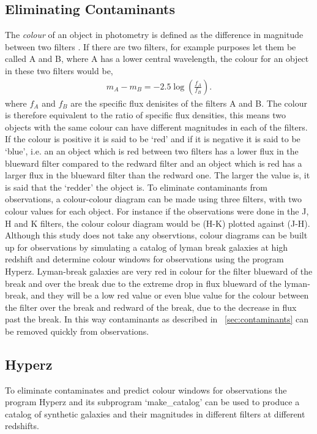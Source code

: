     \subsection{Eliminating Contaminants} %
    \label{sub:Eliminating_Contanimants}
		 The \emph{colour} of an object in photometry is defined as the difference in magnitude between two filters \cite[21]{Romanishin}.  If there are two filters, for example purposes let them be called A and B, where A has a lower central wavelength, the colour for an object in these two filters would be,
		\begin{align}
			m_A-m_B=-2.5\log\left(\frac{f_A}{f_B}\right).
		\end{align}
		 where $f_A$ and $f_B$ are the specific flux denisites of the filters A and B\cite[19]{Romanishin}. The colour is therefore equivalent to the ratio of specific flux densities, this means two objects with the same colour can have different magnitudes in each of the filters. If the colour is positive it is said to be `red' and if it is negative it is said to be `blue', i.e. an an object which is red between two filters has a lower flux in the blueward filter compared to the redward filter and an object which is red has a larger flux in the blueward filter than the redward one.  The larger the value is, it is said that the `redder' the object is. To eliminate contaminants from observations, a colour-colour diagram can be made using three filters, with two colour values for each object. For instance if the observations were done in the J, H and K filters, the colour colour diagram would be (H-K) plotted against (J-H). Although this study does not take any observtions, colour diagrams can be built up for observations by simulating a catalog of lyman break galaxies at high redshift and determine colour windows for observations using the program Hyperz. Lyman-break galaxies are very red in colour for the filter blueward of the break and over the break due to the extreme drop in flux blueward of the lyman-break, and they will be a low red value or even blue value for the colour between the filter over the break and redward of the break, due to the decrease in flux past the break. In this way contaminants as described in ~\ref{sec:contaminants} can be removed quickly from observations.


	\subsection{Hyperz} %
	\label{sub:Hyperz}
		To eliminate contaminates and predict colour windows for observations the program Hyperz and its subprogram `make\_catalog' can be used to produce a catalog of synthetic galaxies and their magnitudes in different filters at different redshifts.

